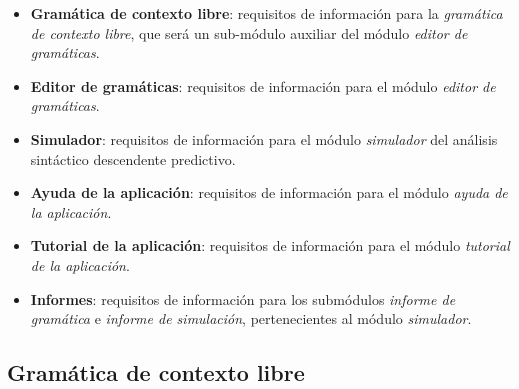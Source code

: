 \begin{itemize}
 \item \textbf{Gramática de contexto libre}: requisitos de información para la \textit{gramática de contexto libre}, que será un sub-módulo auxiliar del módulo \textit{editor de gramáticas}.
 
 \item \textbf{Editor de gramáticas}: requisitos de información para el módulo \textit{editor de gramáticas}.
 
 \item \textbf{Simulador}: requisitos de información para el módulo \textit{simulador} del análisis sintáctico descendente predictivo.
 
 \item \textbf{Ayuda de la aplicación}: requisitos de información para el módulo \textit{ayuda de la aplicación}.
 
 \item \textbf{Tutorial de la aplicación}: requisitos de información para el módulo \textit{tutorial de la aplicación}.

 \item \textbf{Informes}: requisitos de información para los submódulos \textit{informe de gramática} e \textit{informe de simulación}, pertenecientes al módulo \textit{simulador}.
\end{itemize}

\subsection{Gramática de contexto libre}

